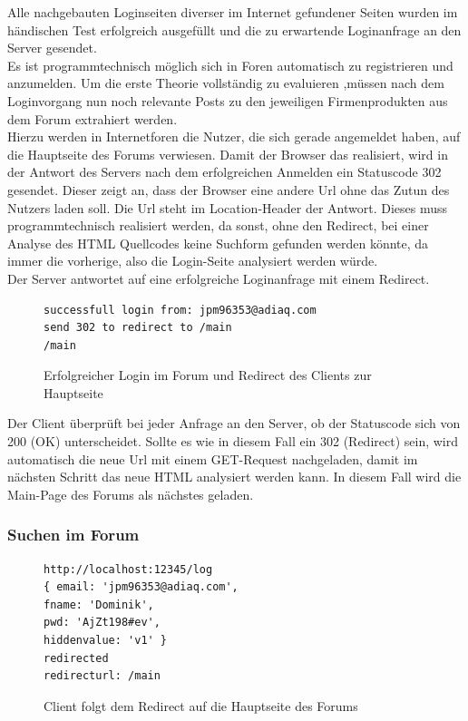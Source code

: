 Alle nachgebauten Loginseiten diverser im Internet gefundener Seiten wurden im händischen Test erfolgreich ausgefüllt und die zu erwartende Loginanfrage an den Server gesendet.\\
Es ist programmtechnisch möglich sich in Foren automatisch zu registrieren und anzumelden. Um die erste Theorie vollständig zu evaluieren ,müssen nach dem Loginvorgang nun noch relevante Posts zu den jeweiligen Firmenprodukten aus dem Forum extrahiert werden.\\
Hierzu werden in Internetforen die Nutzer, die sich gerade angemeldet haben, auf die Hauptseite des Forums verwiesen. Damit der Browser das realisiert, wird in der Antwort des Servers nach dem erfolgreichen Anmelden ein Statuscode 302 gesendet. Dieser zeigt an, dass der Browser eine andere Url ohne das Zutun des Nutzers laden soll. Die Url steht im Location-Header der Antwort. Dieses muss programmtechnisch realisiert werden, da sonst, ohne den Redirect, bei einer Analyse des HTML Quellcodes keine Suchform gefunden werden könnte, da immer die vorherige, also die Login-Seite analysiert werden würde.\\
Der Server antwortet auf eine erfolgreiche Loginanfrage mit einem Redirect.

\begin{figure}[ht]
\begin{lstlisting}[language=HTML5]
successfull login from: jpm96353@adiaq.com
send 302 to redirect to /main
/main
\end{lstlisting}
\caption{Erfolgreicher Login im Forum und Redirect des Clients zur Hauptseite}
\end{figure}

Der Client überprüft bei jeder Anfrage an den Server, ob der Statuscode sich von 200 (OK) unterscheidet. Sollte es wie in diesem Fall ein 302 (Redirect) sein, wird automatisch die neue Url mit einem GET-Request nachgeladen, damit im nächsten Schritt das neue HTML analysiert werden kann. In diesem Fall wird die Main-Page des Forums als nächstes geladen.

\newpage

\subsubsection{Suchen im Forum}

\begin{figure}[ht]
\begin{lstlisting}[language=HTML5]
http://localhost:12345/log
{ email: 'jpm96353@adiaq.com',
fname: 'Dominik',
pwd: 'AjZt198#ev',
hiddenvalue: 'v1' }
redirected
redirecturl: /main
\end{lstlisting}
\caption{Client folgt dem Redirect auf die Hauptseite des Forums}
\end{figure}

